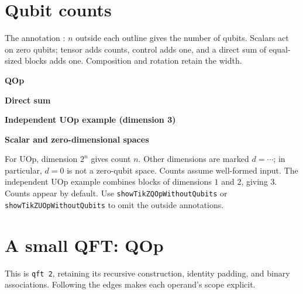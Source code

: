 \documentclass[11pt,a4paper,landscape]{article}
\begin{document}
\newpage
\section*{Qubit counts}
The annotation $:\,n$ outside each outline gives the number of qubits.
Scalars act on zero qubits; tensor adds counts, control adds one, and a direct
sum of equal-sized blocks adds one. Composition and rotation retain the width.
\begin{center}
\begin{minipage}[t]{.48\textwidth}\centering
\textbf{QOp}\par\medskip
\end{minipage}\hfill
\begin{minipage}[t]{.48\textwidth}\centering
\textbf{Direct sum}\par\medskip
\end{minipage}
\end{center}
\begin{center}
\begin{minipage}[t]{.48\textwidth}\centering
\textbf{Independent UOp example (dimension 3)}\par\medskip
\end{minipage}\hfill
\begin{minipage}[t]{.48\textwidth}\centering
\textbf{Scalar and zero-dimensional spaces}\par\medskip
\end{minipage}
\end{center}
For UOp, dimension $2^n$ gives count $n$. Other dimensions are marked $d=\cdots$;
in particular, $d=0$ is not a zero-qubit space. Counts assume well-formed input.
The independent UOp example combines blocks of dimensions $1$ and $2$, giving $3$.
Counts appear by default. Use \texttt{showTikZQOpWithoutQubits} or
\texttt{showTikZUOpWithoutQubits} to omit the outside annotations.

\newpage
\section*{A small QFT: QOp}
This is \texttt{qft 2}, retaining its recursive construction, identity padding,
and binary associations. Following the edges makes each operand's scope explicit.
\begin{center}\end{center}
\end{document}
